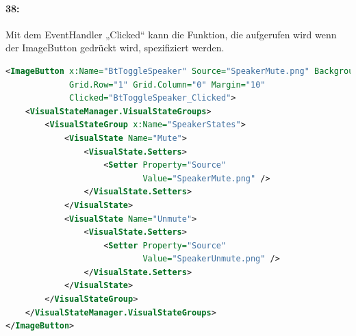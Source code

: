 \paragraph{38:} Mit dem EventHandler „Clicked“ kann die Funktion, die aufgerufen wird wenn der ImageButton gedrückt wird, spezifiziert werden.
\begin{lstlisting}[firstnumber=43,language=xml]
<ImageButton x:Name="BtToggleSpeaker" Source="SpeakerMute.png" BackgroundColor="Transparent"
             Grid.Row="1" Grid.Column="0" Margin="10"
             Clicked="BtToggleSpeaker_Clicked">
    <VisualStateManager.VisualStateGroups>
        <VisualStateGroup x:Name="SpeakerStates">
            <VisualState Name="Mute">
                <VisualState.Setters>
                    <Setter Property="Source"
                            Value="SpeakerMute.png" />
                </VisualState.Setters>
            </VisualState>
            <VisualState Name="Unmute">
                <VisualState.Setters>
                    <Setter Property="Source"
                            Value="SpeakerUnmute.png" />
                </VisualState.Setters>
            </VisualState>
        </VisualStateGroup>
    </VisualStateManager.VisualStateGroups>
</ImageButton>
\end{lstlisting}
